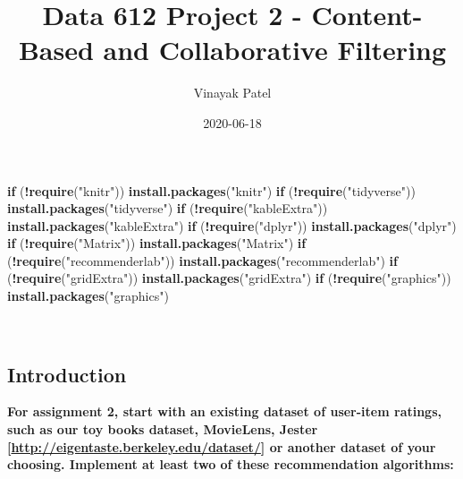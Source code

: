 \documentclass[]{article}
\title{Data 612 Project 2 - Content-Based and Collaborative Filtering}
\author{Vinayak Patel}
\date{2020-06-18}
\newenvironment{Shaded}{\begin{snugshade}}{\end{snugshade}}
\newcommand{\ControlFlowTok}[1]{\textcolor[rgb]{0.13,0.29,0.53}{\textbf{#1}}}
\newcommand{\KeywordTok}[1]{\textcolor[rgb]{0.13,0.29,0.53}{\textbf{#1}}}
\newcommand{\NormalTok}[1]{#1}
\newcommand{\OperatorTok}[1]{\textcolor[rgb]{0.81,0.36,0.00}{\textbf{#1}}}
\newcommand{\StringTok}[1]{\textcolor[rgb]{0.31,0.60,0.02}{#1}}
\begin{document}
\maketitle

\begin{Shaded}
\begin{Highlighting}[]
\ControlFlowTok{if}\NormalTok{ (}\OperatorTok{!}\KeywordTok{require}\NormalTok{(}\StringTok{"knitr"}\NormalTok{)) }\KeywordTok{install.packages}\NormalTok{(}\StringTok{"knitr"}\NormalTok{)}
\ControlFlowTok{if}\NormalTok{ (}\OperatorTok{!}\KeywordTok{require}\NormalTok{(}\StringTok{"tidyverse"}\NormalTok{)) }\KeywordTok{install.packages}\NormalTok{(}\StringTok{"tidyverse"}\NormalTok{)}
\ControlFlowTok{if}\NormalTok{ (}\OperatorTok{!}\KeywordTok{require}\NormalTok{(}\StringTok{"kableExtra"}\NormalTok{)) }\KeywordTok{install.packages}\NormalTok{(}\StringTok{"kableExtra"}\NormalTok{)}
\ControlFlowTok{if}\NormalTok{ (}\OperatorTok{!}\KeywordTok{require}\NormalTok{(}\StringTok{"dplyr"}\NormalTok{)) }\KeywordTok{install.packages}\NormalTok{(}\StringTok{"dplyr"}\NormalTok{)}
\ControlFlowTok{if}\NormalTok{ (}\OperatorTok{!}\KeywordTok{require}\NormalTok{(}\StringTok{"Matrix"}\NormalTok{)) }\KeywordTok{install.packages}\NormalTok{(}\StringTok{"Matrix"}\NormalTok{)}
\ControlFlowTok{if}\NormalTok{ (}\OperatorTok{!}\KeywordTok{require}\NormalTok{(}\StringTok{"recommenderlab"}\NormalTok{)) }\KeywordTok{install.packages}\NormalTok{(}\StringTok{"recommenderlab"}\NormalTok{)}
\ControlFlowTok{if}\NormalTok{ (}\OperatorTok{!}\KeywordTok{require}\NormalTok{(}\StringTok{"gridExtra"}\NormalTok{)) }\KeywordTok{install.packages}\NormalTok{(}\StringTok{"gridExtra"}\NormalTok{)}
\ControlFlowTok{if}\NormalTok{ (}\OperatorTok{!}\KeywordTok{require}\NormalTok{(}\StringTok{"graphics"}\NormalTok{)) }\KeywordTok{install.packages}\NormalTok{(}\StringTok{"graphics"}\NormalTok{)}
\end{Highlighting}
\end{Shaded}

~

\hypertarget{introduction}{%
\subsection{Introduction}\label{introduction}}

\textbf{For assignment 2, start with an existing dataset of user-item
ratings, such as our toy books dataset, MovieLens, Jester
{[}\url{http://eigentaste.berkeley.edu/dataset/}{]} or another dataset
of your choosing. Implement at least two of these recommendation
algorithms:}
\end{document}
